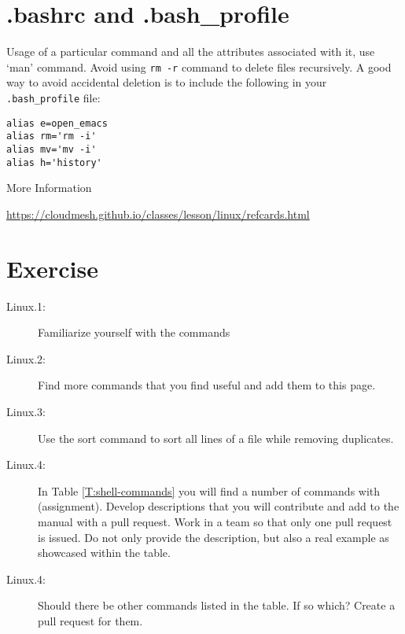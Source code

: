\section{.bashrc and .bash\_profile}\label{bashrc-and-.bash_profile}

Usage of a particular command and all the attributes associated with it,
use `man' command. Avoid using \verb|rm -r| command to delete files
recursively. A good way to avoid accidental deletion is to include the
following in your \verb|.bash_profile| file:

\begin{verbatim}
alias e=open_emacs
alias rm='rm -i'
alias mv='mv -i' 
alias h='history'
\end{verbatim}

More Information

\url{https://cloudmesh.github.io/classes/lesson/linux/refcards.html}

\section{Exercise}

\begin{description}
\item[Linux.1:]
Familiarize yourself with the commands
\item[Linux.2:]
Find more commands that you find useful and add them to this page.
\item[Linux.3:]
Use the sort command to sort all lines of a file while removing
duplicates.
\item[Linux.4:] In Table \ref{T:shell-commands} you will find a number
  of commands with (assignment). Develop descriptions that you will
  contribute and add to the manual with a pull request. Work in a team
  so that only one pull request is issued. Do not only provide the
  description, but also a real example as showcased within the table.
\item[Linux.4:] Should there be other commands listed in the table. If
  so which? Create a pull request for them. 
\end{description}
